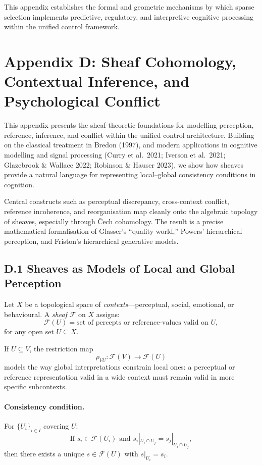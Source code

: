 \documentclass[11pt,a4paper,twoside]{article}
\begin{document}
This appendix establishes the formal and geometric mechanisms by which sparse selection implements predictive, regulatory, and interpretive cognitive processing within the unified control framework.

\section*{Appendix D: Sheaf Cohomology, Contextual Inference, and Psychological Conflict}

This appendix presents the sheaf-theoretic foundations for modelling perception, reference, inference, and conflict within the unified control architecture. Building on the classical treatment in Bredon (1997), and modern applications in cognitive modelling and signal processing (Curry et al.\ 2021; Iverson et al.\ 2021; Glazebrook \& Wallace 2022; Robinson \& Hauser 2023), we show how sheaves provide a natural language for representing local–global consistency conditions in cognition.

Central constructs such as perceptual discrepancy, cross-context conflict, reference incoherence, and reorganisation map cleanly onto the algebraic topology of sheaves, especially through \v{C}ech cohomology. The result is a precise mathematical formalisation of Glasser’s “quality world,” Powers’ hierarchical perception, and Friston’s hierarchical generative models.

\subsection*{D.1 Sheaves as Models of Local and Global Perception}

Let $X$ be a topological space of \emph{contexts}—perceptual, social, emotional, or behavioural. A \emph{sheaf} $\mathscr{F}$ on $X$ assigns:
\[
\mathscr{F}(U) = \text{set of percepts or reference-values valid on } U,
\]
for any open set $U \subseteq X$.

If $U \subseteq V$, the restriction map
\[
\rho_{VU} : \mathscr{F}(V) \to \mathscr{F}(U)
\]
models the way global interpretations constrain local ones: a perceptual or reference representation valid in a wide context must remain valid in more specific subcontexts.

\paragraph{Consistency condition.}
For $\{U_i\}_{i \in I}$ covering $U$:
\[
\text{If } s_i \in \mathscr{F}(U_i) \text{ and } s_i|_{U_i \cap U_j} = s_j|_{U_i \cap U_j},
\]
then there exists a unique $s \in \mathscr{F}(U)$ with $s|_{U_i} = s_i$.
\end{document}
